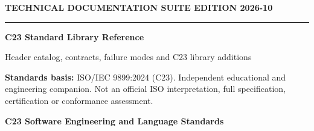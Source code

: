 \documentclass[10pt,letterpaper,oneside]{report}
\begin{document}
\hypersetup{pageanchor=false}%
\begin{titlepage}
\color{ink}\vspace*{1.2in}
{\sffamily\small\color{accent}\bfseries TECHNICAL DOCUMENTATION SUITE \hfill EDITION 2026-10}\par
\vspace{.3in}\rule{\linewidth}{1.5pt}\par\vspace{.22in}
{\Huge\bfseries C23 Standard Library Reference}\par\vspace{.22in}
{\Large\color{grayblue}Header catalog, contracts, failure modes and C23 library additions}\par\vspace{.4in}
\begin{keybox}\textbf{Standards basis:} ISO/IEC 9899:2024 (C23). Independent educational and engineering companion. Not an official ISO interpretation, full specification, certification or conformance assessment.\end{keybox}
\vfill{\large\bfseries C23 Software Engineering and Language Standards}\par{}\par
\end{titlepage}\hypersetup{pageanchor=true}
\tableofcontents\clearpage{}
\end{document}

